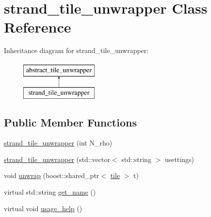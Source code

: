 \hypertarget{classstrand__tile__unwrapper}{\section{strand\-\_\-tile\-\_\-unwrapper Class Reference}
\label{classstrand__tile__unwrapper}
}
Inheritance diagram for strand\-\_\-tile\-\_\-unwrapper\-:\begin{figure}[H]
\begin{center}
\leavevmode
\includegraphics[height=2.000000cm]{classstrand__tile__unwrapper}
\end{center}
\end{figure}
\subsection*{Public Member Functions}
\begin{DoxyCompactItemize}
\item 
\hyperlink{classstrand__tile__unwrapper_a266a163ecbe547398be7339039f15991}{strand\-\_\-tile\-\_\-unwrapper} (int N\-\_\-rho)
\item 
\hyperlink{classstrand__tile__unwrapper_a5ba0ae8f39431c91e35bec18de4d67ef}{strand\-\_\-tile\-\_\-unwrapper} (std\-::vector$<$ std\-::string $>$ usettings)
\item 
void \hyperlink{classstrand__tile__unwrapper_a520d7832e80746c9996fe042b5993235}{unwrap} (boost\-::shared\-\_\-ptr$<$ \hyperlink{classtile}{tile} $>$ t)
\item 
virtual std\-::string \hyperlink{classstrand__tile__unwrapper_ae4ce9d7459840ada66b7492ea2873969}{get\-\_\-name} ()
\item 
virtual void \hyperlink{classstrand__tile__unwrapper_aebfdb44f1be923a6528471ea38174669}{usage\-\_\-help} ()
\end{DoxyCompactItemize}


